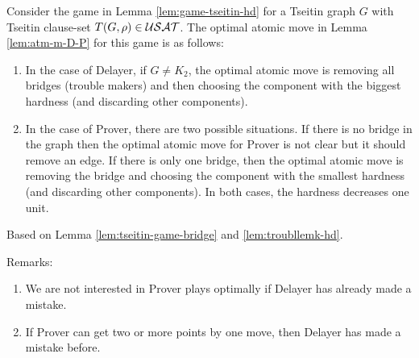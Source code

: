 \documentclass{report}
\begin{document}
\begin{lem}\label{lem:atmvtseitin}
Consider the game in Lemma \ref{lem:game-tseitin-hd} for a Tseitin graph $G$ with Tseitin clause-set $T(G,\rho) \in \mathcal{USAT}$. The optimal atomic move in Lemma \ref{lem:atm-m-D-P} for this game is as follows:
  \begin{enumerate}
  \item In the case of Delayer, if $G \not = K_2$, the optimal atomic move is removing all bridges (trouble makers) and then choosing the component with the biggest hardness (and discarding other components). 
  \item In the case of Prover, there are two possible situations. If there is no bridge in the graph then the optimal atomic move for Prover is not clear but it should remove an edge. If there is only one bridge, then the optimal atomic move is removing the bridge and choosing the component with the smallest hardness (and discarding other components). In both cases, the hardness decreases one unit.
  \end{enumerate}
\end{lem}
\begin{prf}
Based on Lemma \ref{lem:tseitin-game-bridge} and \ref{lem:troubllemk-hd}.
\end{prf}
Remarks:
  \begin{enumerate}
  \item We are not interested in Prover plays optimally if Delayer has already made a mistake.
  \item If Prover can get two or more points by one move, then Delayer has made a mistake before.
  \end{enumerate}

\end{document}
